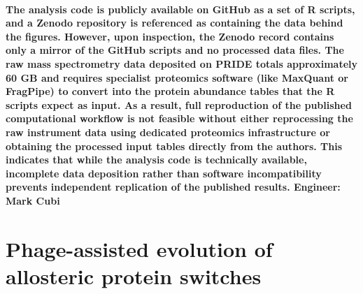 \documentclass{article}
\begin{document}
\paragraph{
     The analysis code is publicly available on GitHub as a set of R scripts, and a Zenodo repository is referenced as containing the data behind the figures. However, upon inspection, the Zenodo record contains only a mirror of the GitHub scripts and no processed data files. The raw mass spectrometry data deposited on PRIDE totals approximately 60 GB and requires specialist proteomics software (like MaxQuant or FragPipe) to convert into the protein abundance tables that the R scripts expect as input. As a result, full reproduction of the published computational workflow is not feasible without either reprocessing the raw instrument data using dedicated proteomics infrastructure or obtaining the processed input tables directly from the authors. This indicates that while the analysis code is technically available, incomplete data deposition rather than software incompatibility prevents independent replication of the published results. Engineer: Mark Cubi
}

\section{Phage-assisted evolution of allosteric protein switches \cite{Southern2026}}
\end{document}
